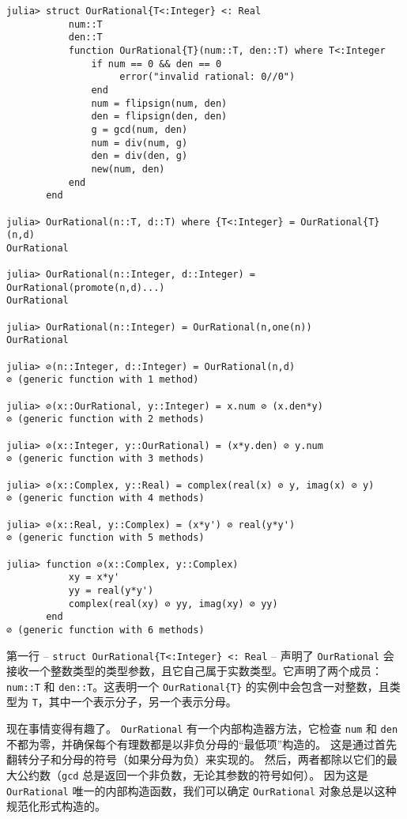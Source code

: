 \begin{verbatim}
julia> struct OurRational{T<:Integer} <: Real
           num::T
           den::T
           function OurRational{T}(num::T, den::T) where T<:Integer
               if num == 0 && den == 0
                    error("invalid rational: 0//0")
               end
               num = flipsign(num, den)
               den = flipsign(den, den)
               g = gcd(num, den)
               num = div(num, g)
               den = div(den, g)
               new(num, den)
           end
       end

julia> OurRational(n::T, d::T) where {T<:Integer} = OurRational{T}(n,d)
OurRational

julia> OurRational(n::Integer, d::Integer) = OurRational(promote(n,d)...)
OurRational

julia> OurRational(n::Integer) = OurRational(n,one(n))
OurRational

julia> ⊘(n::Integer, d::Integer) = OurRational(n,d)
⊘ (generic function with 1 method)

julia> ⊘(x::OurRational, y::Integer) = x.num ⊘ (x.den*y)
⊘ (generic function with 2 methods)

julia> ⊘(x::Integer, y::OurRational) = (x*y.den) ⊘ y.num
⊘ (generic function with 3 methods)

julia> ⊘(x::Complex, y::Real) = complex(real(x) ⊘ y, imag(x) ⊘ y)
⊘ (generic function with 4 methods)

julia> ⊘(x::Real, y::Complex) = (x*y') ⊘ real(y*y')
⊘ (generic function with 5 methods)

julia> function ⊘(x::Complex, y::Complex)
           xy = x*y'
           yy = real(y*y')
           complex(real(xy) ⊘ yy, imag(xy) ⊘ yy)
       end
⊘ (generic function with 6 methods)
\end{verbatim}



第一行 – \texttt{struct OurRational\{T<:Integer\} <: Real} – 声明了 \texttt{OurRational} 会接收一个整数类型的类型参数，且它自己属于实数类型。它声明了两个成员：\texttt{num::T} 和 \texttt{den::T}。这表明一个 \texttt{OurRational\{T\}} 的实例中会包含一对整数，且类型为 \texttt{T}，其中一个表示分子，另一个表示分母。



现在事情变得有趣了。 \texttt{OurRational} 有一个内部构造器方法，它检查 \texttt{num} 和 \texttt{den} 不都为零，并确保每个有理数都是以非负分母的“最低项”构造的。 这是通过首先翻转分子和分母的符号（如果分母为负）来实现的。 然后，两者都除以它们的最大公约数（\texttt{gcd} 总是返回一个非负数，无论其参数的符号如何）。 因为这是 \texttt{OurRational} 唯一的内部构造函数，我们可以确定 \texttt{OurRational} 对象总是以这种规范化形式构造的。



